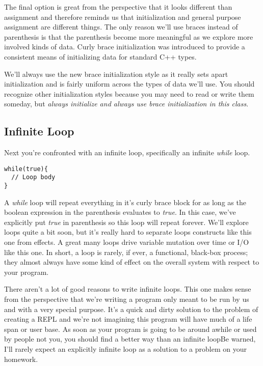 \documentclass[]{tufte-handout}
\begin{document}
The final option is great from the perspective that it looks different than assignment and therefore reminds us that initialization and general purpose assignment are different things. The only reason we'll use braces instead of parenthesis is that the parenthesis become more meaningful as we explore more involved kinds of data.  Curly brace initialization was introduced to provide a consistent means of initializing data for standard C++ types. 

We'll always use the new brace initialization style as it really sets apart initialization and is fairly uniform across the types of data we'll use. You should recognize other initialization styles because you may need to read or write them someday, but \textit{always initialize and always use brace initialization in this class}.

\subsection{Infinite Loop}

Next you're confronted with an infinite loop, specifically an infinite \textit{while} loop. 
\begin{verbatim}
while(true){
  // Loop body
}
\end{verbatim}
A \textit{while} loop will repeat everything in it's curly brace block for as long as the boolean expression in the parenthesis evaluates to \textit{true}. In this case, we've explicitly put \textit{true} in parenthesis so this loop will repeat forever. We'll explore loops quite a bit soon, but it's really hard to separate loops constructs like this one from effects. A great many loops drive variable mutation over time or I/O like this one. In short, a loop is rarely, if ever, a functional, black-box process; they almost always have some kind of effect on the overall system with respect to your program.  

There aren't a lot of good reasons to write infinite loops. This one makes sense from the perspective that we're writing a program only meant to be run by us and with a very special purpose. It's a quick and dirty solution to the problem of creating a REPL and we're not imagining this program will have much of a life span or user base. As soon as your program is going to be around awhile or used by people not you, you should find a better way than an infinite loopBe warned, I'll rarely expect an explicitly infinite loop as a solution to a problem on your homework. 
\end{document}
